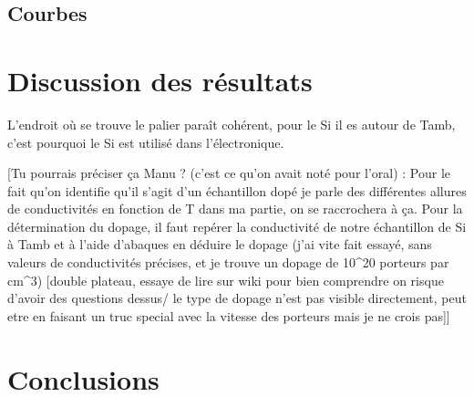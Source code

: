 \subsection*{Courbes}


\section*{Discussion des résultats}
L'endroit où se trouve le palier paraît cohérent, pour le Si il es autour de Tamb, c'est pourquoi le Si est utilisé dans l'électronique.


[Tu pourrais préciser ça Manu ? (c'est ce qu'on avait noté pour l'oral) : 
Pour le fait qu'on identifie qu'il s'agit d'un échantillon dopé je parle des différentes allures de conductivités en fonction de T dans ma partie, on se raccrochera à ça.
Pour la détermination du dopage, il faut repérer la conductivité de notre échantillon de Si à Tamb et à l'aide d'abaques en déduire le dopage (j'ai vite fait essayé, sans valeurs de conductivités précises, et je trouve un dopage de 10^20 porteurs par cm^3)
    [double plateau, essaye de lire sur wiki pour bien comprendre on risque d'avoir des questions dessus/ le type de dopage n'est pas visible directement, peut etre en faisant un truc special avec la vitesse des porteurs mais je ne crois pas]]


\section*{Conclusions}

